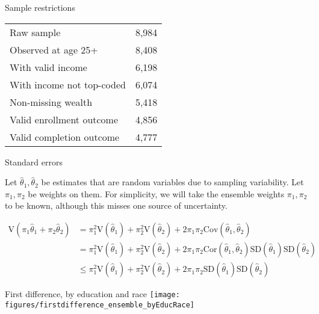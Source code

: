\documentclass{beamer}
\newcommand\V{\text{V}}
\newcommand{\Cov}{\text{Cov}}
\newcommand{\Cor}{\text{Cor}}
\begin{document}
\begin{frame}{Sample restrictions}

\begin{tabular}{ll}
\hline
Raw sample & 8,984 \\
Observed at age 25+ & 8,408 \\
With valid income & 6,198 \\
With income not top-coded & 6,074 \\
Non-missing wealth & 5,418 \\
Valid enrollment outcome & 4,856 \\
Valid completion outcome& 4,777 \\
\hline
\end{tabular}
\end{frame}

\begin{frame}{Standard errors}

Let $\hat\theta_1,\hat\theta_2$ be estimates that are random variables due to sampling variability. Let $\pi_1,\pi_2$ be weights on them. For simplicity, we will take the ensemble weights $\pi_1,\pi_2$ to be known, although this misses one source of uncertainty.

$$\begin{aligned}
\V(\pi_1\hat\theta_1 + \pi_2\hat\theta_2) &= \pi_1^2\V(\hat\theta_1) + \pi_2^2\V(\hat\theta_2) + 2\pi_1\pi_2\Cov(\hat\theta_1,\hat\theta_2) \\
&= \pi_1^2\V(\hat\theta_1) + \pi_2^2\V(\hat\theta_2) + 2\pi_1\pi_2\Cor(\hat\theta_1,\hat\theta_2)\text{SD}(\hat\theta_1)\text{SD}(\hat\theta_2) \\
&\leq \pi_1^2\V(\hat\theta_1) + \pi_2^2\V(\hat\theta_2) + 2\pi_1\pi_2\text{SD}(\hat\theta_1)\text{SD}(\hat\theta_2)
\end{aligned}$$

\end{frame}


\begin{frame}{First difference, by education and race}
\texttt{[image: figures/firstdifference\_ensemble\_byEducRace]}
\end{frame}
\end{document}

